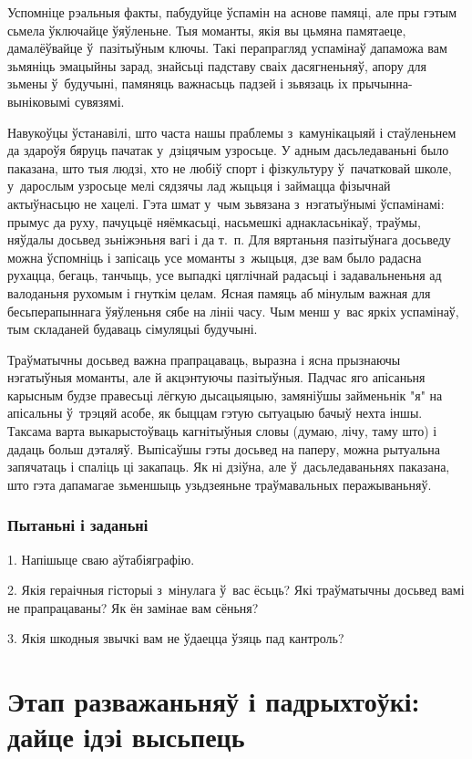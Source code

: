 Успомніце рэальныя факты, пабудуйце ўспамін на аснове памяці, але пры гэтым сьмела ўключайце ўяўленьне. Тыя моманты, якія вы цьмяна памятаеце, дамалёўвайце ў~пазітыўным ключы. Такі перапрагляд успамінаў дапаможа вам зьмяніць эмацыйны зарад, знайсьці падставу сваіх дасягненьняў, апору для зьмены ў~будучыні, памяняць важнасьць падзей і зьвязаць іх прычынна-выніковымі сувязямі.

Навукоўцы ўстанавілі, што часта нашы праблемы з~камунікацыяй і стаўленьнем да здароўя бяруць пачатак у~дзіцячым узросьце. У адным дасьледаваньні было паказана, што тыя людзі, хто не любіў спорт і фізкультуру ў~пачатковай школе, у~дарослым узросьце мелі сядзячы лад жыцьця і займацца фізычнай актыўнасьцю не хацелі. Гэта шмат у~чым зьвязана з~нэгатыўнымі ўспамінамі: прымус да руху, пачуцьцё няёмкасьці, насьмешкі аднакласьнікаў, траўмы, няўдалы досьвед зьніжэньня вагі і да т.~п. Для вяртаньня пазітыўнага досьведу можна ўспомніць і запісаць усе моманты з~жыцьця, дзе вам было радасна рухацца, бегаць, танчыць, усе выпадкі цяглічнай радасьці і задавальненьня ад валоданьня рухомым і гнуткім целам. Ясная памяць аб мінулым важная для бесьперапыннага ўяўленьня сябе на лініі часу. Чым менш у~вас яркіх успамінаў, тым складаней будаваць сімуляцыі будучыні.

Траўматычны досьвед важна прапрацаваць, выразна і ясна прызнаючы нэгатыўныя моманты, але й акцэнтуючы пазітыўныя. Падчас яго апісаньня карысным будзе правесьці лёгкую дысацыяцыю, замяніўшы займеньнік "я" на апісальны ў~трэцяй асобе, як быццам гэтую сытуацыю бачыў нехта іншы. Таксама варта выкарыстоўваць кагнітыўныя словы (думаю, лічу, таму што) і дадаць больш дэталяў. Выпісаўшы гэты досьвед на паперу, можна рытуальна запячатаць і спаліць ці закапаць. Як ні дзіўна, але ў~дасьледаваньнях паказана, што гэта дапамагае зьменшыць узьдзеяньне траўмавальных перажываньняў.

\subsubsection{Пытаньні і заданьні}

1. Напішыце сваю аўтабіяграфію.

2. Якія гераічныя гісторыі з~мінулага ў~вас ёсьць? Які траўматычны досьвед вамі не прапрацаваны? Як ён замінае вам сёньня?

3. Якія шкодныя звычкі вам не ўдаецца ўзяць пад кантроль?


\section{Этап разважаньняў і падрыхтоўкі: дайце ідэі высьпець}

